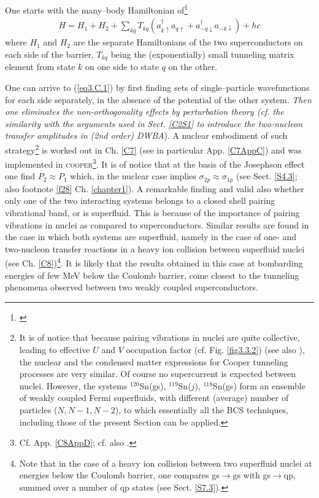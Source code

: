 One starts with the many--body Hamiltonian of\footnote{\cite{Cohen:62}}
\begin{align}\label{eq3.C.1}
H=H_1+H_2+\sum_{kq}T_{kq}(a_{k\uparrow}^\dagger a_{q\uparrow}+a_{-q\downarrow}^\dagger a_{-k\downarrow})+hc
\end{align}
where $H_1$ and $H_2$ are the separate Hamiltonians of the two superconductors on each side of the barrier, $T_{kq}$ being the (exponentially) small tunneling matrix element from state $k$ on one side to state $q$ on the other.


One can arrive to  (\ref{eq3.C.1}) by first finding sets of single--particle wavefunctions for each side separately, in the absence of the potential of the other system. \textit{Then one eliminates the non-orthogonality effects by perturbation theory (cf. the similarity with the arguments used in Sect. \ref{C2S1} to introduce the two-nucleon transfer amplitudes in (2nd order) DWBA}). A nuclear embodiment of such strategy\footnote{\label{f45}It is of notice that because  pairing vibrations in nuclei are quite collective, leading to effective $U$ and $V$ occupation factor (cf. Fig. \ref{fig3.3.2}) (see also \cite{Potel:13b}), the nuclear and the condensed matter expressions for Cooper tunneling processes are very similar. Of course no supercurrent is expected between nuclei. However, the systems $^{120}$Sn(gs), $^{119}$Sn($j$), $^{118}$Sn(gs) form an ensemble of weakly coupled Fermi superfluids, with different (average) number of particles ($N,N-1,N-2$), to which essentially all the BCS techniques, including those of the present Section can be applied.} is worked out in Ch. \ref{C7} (see in particular App. \ref{C7AppC}) and was implemented in \textsc{cooper}\footnote{Cf. App. \ref{C8AppD}; cf. also \cite{Broglia:04a}.}. It is of notice that at the basis of the Josephson effect one find $P_2\approx P_1$ which, in the nuclear case implies $\sigma_{2p}\approx\sigma_{1p}$ (see Sect. \ref{S4.3}; also footnote \ref{f28} Ch. \ref{chapter1}). A remarkable finding and valid also whether only one of the two interacting systems belongs to a closed shell pairing vibrational band, or is superfluid. This is because of the importance of pairing vibrations in nuclei as compared to superconductors. Similar results are found in the case in which both systems are superfluid, namely in the case of  one- and two-nucleon transfer reactions in a heavy ion collision between superfluid nuclei (see Ch. \ref{C8})\footnote{Note that in the case of a heavy ion collision between two superfluid nuclei at energies below the Coulomb barrier, one compares gs$\to$gs with gs$\to$qp, summed over a number of qp states (see Sect. \ref{S7.3}).}. 
It is likely that the results obtained in this case at bombarding energies of few MeV below the Coulomb barrier, come closest to the tunneling phenomena observed between two weakly coupled superconductors.

